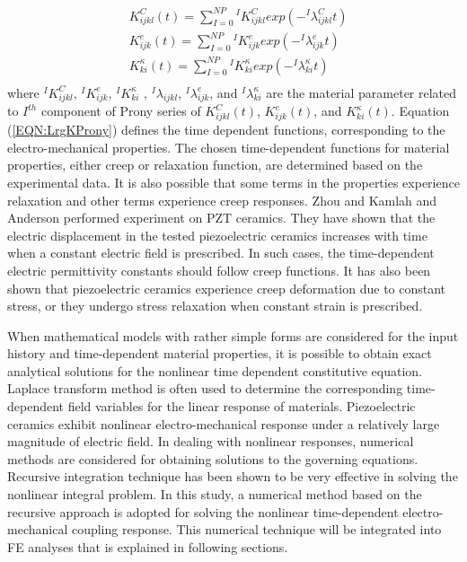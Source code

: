 \begin{equation}
\label{EQN:LrgKProny}
\begin{aligned}
&K_{ijkl}^C(t) =
\sum_{I=0}^{NP}{}^{I}K_{ijkl}^{C} exp(-{}^{I}\lambda_{ijkl}^{C}t) \\
&K_{ijk}^e(t) =
\sum_{I=0}^{NP} {}^{I}K_{ijk}^{e} exp(-{}^{I}\lambda_{ijk}^{e}t) \\
&K_{ki}^\kappa(t) =
\sum_{I=0}^{NP}  {}^{I}K_{ki}^{\kappa} exp(-{}^{I}\lambda_{ki}^{\kappa}t) \\
\end{aligned}
\end{equation}                   
where $ {}^{I}K_{ijkl}^{C} $, $ {}^{I}K_{ijk}^{e} $, $ {}^{I}K_{ki}^{\kappa} $ , $ {}^{I}\lambda_{ijkl} $, $ {}^{I}\lambda_{ijk}^{e} $, and $ {}^{I}\lambda_{ki}^{\kappa} $ are the material parameter related to $ I^{th} $ component of Prony series of $ K_{ijkl}^C(t) $, $ K_{ijk}^e(t) $, and  $ K_{ki}^\kappa(t) $.
Equation (\ref{EQN:LrgKProny}) defines the time dependent functions, corresponding to the electro-mechanical properties.
The chosen time-dependent functions for material properties, either creep or relaxation function, are determined based on the experimental data. 
It is also possible that some terms in the properties experience relaxation and other terms experience creep responses. 
Zhou and Kamlah \cite{zhoudetermination2005} and Anderson \cite{anderson1989piezoceramic} performed experiment on PZT ceramics.
They have shown that the electric displacement in the tested piezoelectric ceramics increases with time when a constant electric field is prescribed. 
In such cases, the time-dependent electric permittivity constants should follow creep functions. 
It has also been shown that piezoelectric ceramics experience creep deformation due to constant stress, or they undergo stress relaxation when constant strain is prescribed.

When mathematical models with rather simple forms are considered for the input history and time-dependent material properties,
it is possible to obtain exact analytical solutions for the nonlinear time dependent constitutive equation.
Laplace transform method \cite{Wineman2000} is often used to determine the corresponding time-dependent field variables for the linear response of materials. 
Piezoelectric ceramics exhibit nonlinear electro-mechanical response under a relatively large magnitude of electric field. 
In dealing with nonlinear responses, numerical methods are considered for obtaining solutions to the governing equations.
Recursive integration technique has been shown to be very effective in solving the nonlinear integral problem. 
In this study, a numerical method based on the recursive approach is adopted for solving the nonlinear time-dependent electro-mechanical coupling response.
This numerical technique will be integrated into FE analyses that is explained in following sections.



